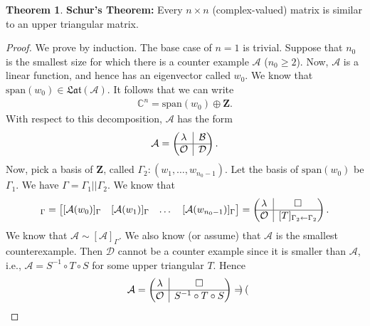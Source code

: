\documentclass{book}
\theoremstyle{definition}
\newtheorem{thm}{Theorem}[section]
\newcommand{\Z}{\mathbf{Z}}
\newcommand{\xpan}{\text{span}}
\newcommand{\rvline}{\hspace*{-\arraycolsep}\vline\hspace*{-\arraycolsep}}
\begin{document}
\begin{thm}
	\textbf{Schur's Theorem:} Every $n\times n$ (complex-valued) matrix is similar to an upper triangular matrix.
	
	\begin{proof}
		We prove by induction. The base case of $n=1$ is trivial. Suppose that $n_0$ is the smallest size for which there is a counter example $\mathcal{A}$ ($n_0 \geq 2$). Now, $\mathcal{A}$ is a linear function, and hence has an eigenvector called $w_0$. We know that $\xpan(w_0) \in \mathfrak{Lat}(\mathcal{A})$. It follows that we can write
		\begin{align*}
		\mathbb{C}^n = \xpan(w_0) \oplus \Z.
		\end{align*} 
		With respect to this decomposition, $\mathcal{A}$ has the form
		\begin{align*}
		\mathcal{A} = \begin{pmatrix}
		\lambda & \rvline & \mathcal{B}\\
		\hline
		\mathcal{O} & \rvline & \mathcal{D}
		\end{pmatrix}.
		\end{align*}
		Now, pick a basis of $\Z$, called $\Gamma_2 : (w_{1},\dots,w_{n_0 - 1})$. Let the basis of $\xpan(w_0)$ be $\Gamma_1$. We have $\Gamma = \Gamma_1 || \Gamma_2$. We know that
		\begin{align*}
		[\mathcal{A}]_\Gamma = \begin{bmatrix}
		[\mathcal{A}(w_0)]_\Gamma & [\mathcal{A}(w_1)]_\Gamma & \dots & [\mathcal{A}(w_{n_0 - 1 })]_\Gamma
		\end{bmatrix}
		=
		\begin{pmatrix}
		\lambda & \rvline & \square\\
		\hline
		\mathcal{O} & \rvline & [T]_{\Gamma_2 \leftarrow \Gamma_2}
		\end{pmatrix}.
		\end{align*}
		We know that $\mathcal{A} \sim [\mathcal{A}]_\Gamma$. We also know (or assume) that $\mathcal{A}$ is the smallest counterexample. Then $\mathcal{D}$ cannot be a counter example since it is smaller than $\mathcal{A}$, i.e., $\mathcal{A} = S^{-1} \circ T \circ S$ for some upper triangular $T$. Hence
		\begin{align*}
		\mathcal{A} = \begin{pmatrix}
		\lambda & \rvline & \square\\
		\hline
		\mathcal{O} & \rvline & S^{-1}\circ T \circ S
		\end{pmatrix}
		=
		\begin{pmatrix}

\end{pmatrix}
\end{align*}
\end{proof}
\end{thm}
\end{document}
